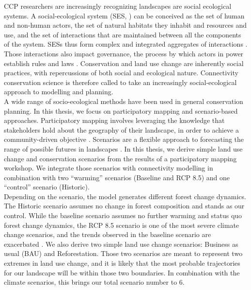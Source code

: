 \documentclass[12pt,Bold,TexShade]{thesis/mcgilletdclass}
\begin{document}
{CCP researchers are increasingly recognizing landscapes are social ecological systems. A social-ecological system (SES, \cite{ostrom_general_2009}) can be conceived  as the set of human and non-human actors, the set of natural habitats they inhabit and resources and use, and the set of interactions that are maintained between all the components of the system. SESs thus form complex and integrated aggregates of interactions \citep{hinkel_enhancing_2014}. Those interactions also impact governance, the process by which actors in power establish rules and laws \citep{bissonnette_comparing_2018}. Conservation and land use change are inherently social practices, with repercussions of both social and ecological nature. Connectivity conservation science is therefore called to take an increasingly social-ecological approach to modelling and planning. \\

A wide range of socio-ecological methods have been used in general conservation planning. In this thesis, we focus on participatory mapping and scenario-based approaches. Participatory mapping involves leveraging the knowledge that stakeholders hold about the geography of their landscape, in order to achieve a community-driven objective  \citep{plieninger_assessing_2013}. Scenarios are a flexible approach to forecasting the range of possible futures in landscapes \citep{peterson_scenario_2003}. In this thesis, we derive simple land use change and conservation scenarios from the results of a participatory mapping workshop. We integrate those scenarios with connectivity modelling in combination with two “warming” scenarios (Baseline and RCP 8.5) and one “control” scenario (Historic). \\

Depending on the scenario, the model generates different forest change dynamics. The Historic scenario assumes no change in forest composition and stands as our control. While the baseline scenario assumes no further warming and status quo forest change dynamics, the RCP 8.5 scenario is one of the most severe climate change scenarios, and the trends observed in the baseline scenario are exacerbated \citep{ipcc_summary_2013}. We also derive two simple land use change scenarios: Business as usual (BAU) and Reforestation. Those two scenarios are meant to represent two extremes in land use change, and it is likely that the most probable trajectories for our landscape will be within those two boundaries. In combination with the climate scenarios, this brings our total scenario number to 6. \\

}
\end{document}
